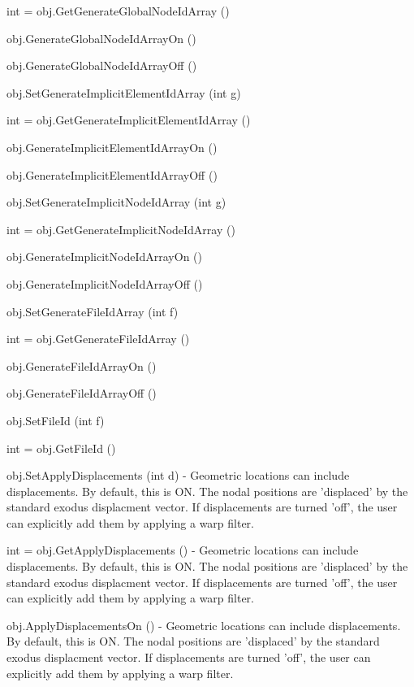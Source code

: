 \begin{DoxyItemize}
\item {\ttfamily int = obj.\-Get\-Generate\-Global\-Node\-Id\-Array ()}  
\item {\ttfamily obj.\-Generate\-Global\-Node\-Id\-Array\-On ()}  
\item {\ttfamily obj.\-Generate\-Global\-Node\-Id\-Array\-Off ()}  
\item {\ttfamily obj.\-Set\-Generate\-Implicit\-Element\-Id\-Array (int g)}  
\item {\ttfamily int = obj.\-Get\-Generate\-Implicit\-Element\-Id\-Array ()}  
\item {\ttfamily obj.\-Generate\-Implicit\-Element\-Id\-Array\-On ()}  
\item {\ttfamily obj.\-Generate\-Implicit\-Element\-Id\-Array\-Off ()}  
\item {\ttfamily obj.\-Set\-Generate\-Implicit\-Node\-Id\-Array (int g)}  
\item {\ttfamily int = obj.\-Get\-Generate\-Implicit\-Node\-Id\-Array ()}  
\item {\ttfamily obj.\-Generate\-Implicit\-Node\-Id\-Array\-On ()}  
\item {\ttfamily obj.\-Generate\-Implicit\-Node\-Id\-Array\-Off ()}  
\item {\ttfamily obj.\-Set\-Generate\-File\-Id\-Array (int f)}  
\item {\ttfamily int = obj.\-Get\-Generate\-File\-Id\-Array ()}  
\item {\ttfamily obj.\-Generate\-File\-Id\-Array\-On ()}  
\item {\ttfamily obj.\-Generate\-File\-Id\-Array\-Off ()}  
\item {\ttfamily obj.\-Set\-File\-Id (int f)}  
\item {\ttfamily int = obj.\-Get\-File\-Id ()}  
\item {\ttfamily obj.\-Set\-Apply\-Displacements (int d)} -\/ Geometric locations can include displacements. By default, this is O\-N. The nodal positions are 'displaced' by the standard exodus displacment vector. If displacements are turned 'off', the user can explicitly add them by applying a warp filter.  
\item {\ttfamily int = obj.\-Get\-Apply\-Displacements ()} -\/ Geometric locations can include displacements. By default, this is O\-N. The nodal positions are 'displaced' by the standard exodus displacment vector. If displacements are turned 'off', the user can explicitly add them by applying a warp filter.  
\item {\ttfamily obj.\-Apply\-Displacements\-On ()} -\/ Geometric locations can include displacements. By default, this is O\-N. The nodal positions are 'displaced' by the standard exodus displacment vector. If displacements are turned 'off', the user can explicitly add them by applying a warp filter.  

\end{DoxyItemize}
